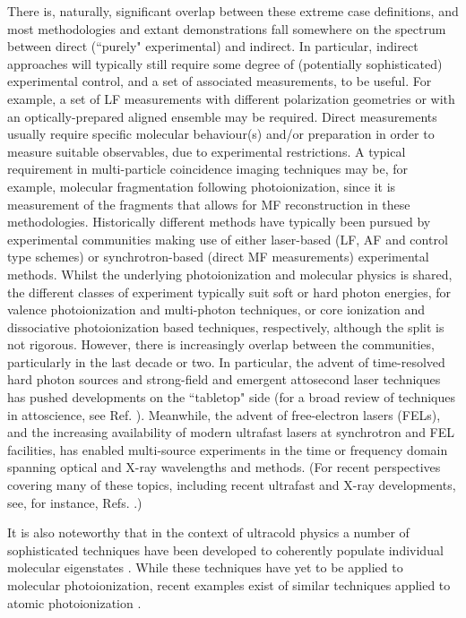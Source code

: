 \documentclass[10pt]{article}
\begin{document}
There is, naturally, significant overlap between these extreme case definitions, and most methodologies and extant demonstrations fall somewhere on the spectrum between direct (``purely" experimental) and indirect. In particular, indirect approaches will typically still require some degree of (potentially sophisticated) experimental control, and a set of associated measurements, to be useful. For example, a set of LF measurements with different polarization geometries or with an optically-prepared aligned ensemble may be required. Direct measurements usually require specific molecular behaviour(s) and/or preparation in order to measure suitable observables, due to experimental restrictions. A typical requirement in multi-particle coincidence imaging techniques may be, for example, molecular fragmentation following photoionization, since it is measurement of the fragments that allows for MF reconstruction in these methodologies. Historically different methods have typically been pursued by experimental communities making use of either laser-based (LF, AF and control type schemes) or synchrotron-based (direct MF measurements) experimental methods. Whilst the underlying photoionization and molecular physics is shared, the different classes of experiment typically suit soft or hard photon energies, for valence photoionization and multi-photon techniques, or core ionization and dissociative photoionization based techniques, respectively, although the split is not rigorous. However, there is increasingly overlap between the communities, particularly in the last decade or two. In particular, the advent of time-resolved hard photon sources and strong-field and emergent attosecond laser techniques has pushed developments on the ``tabletop" side (for a broad review of techniques in attoscience, see Ref. \cite{Krausz2009}). Meanwhile, the advent of free-electron lasers (FELs), and the increasing availability of modern ultrafast lasers at synchrotron and FEL facilities, has enabled multi-source experiments in the time or frequency domain spanning optical and X-ray wavelengths and methods. (For recent perspectives covering many of these topics, including recent ultrafast and X-ray developments, see, for instance, Refs. \cite{Young2018,ueda2019RoadmapPhotonicElectronic}.)

It is also noteworthy that in the context of ultracold physics a number of sophisticated techniques have been developed to coherently populate individual molecular eigenstates \cite{mitra2022QuantumControlMolecules}. While these techniques have yet to be applied to molecular photoionization, recent examples exist of similar techniques applied to atomic photoionization \cite{desilva2021CircularDichroismAtomic}.
\end{document}
